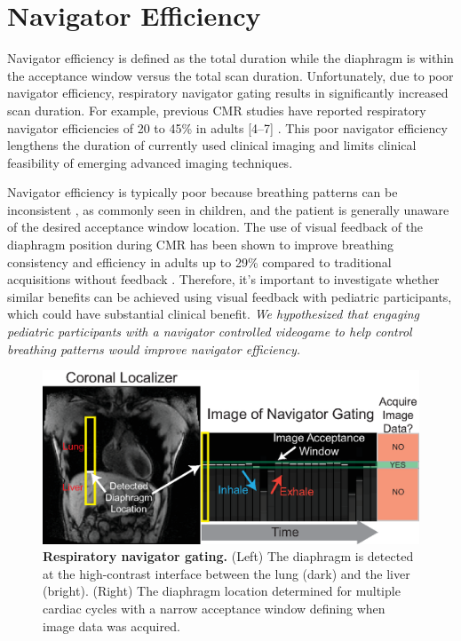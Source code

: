 \section{Navigator Efficiency}
	Navigator efficiency is defined as the total duration while the diaphragm is within the acceptance window versus the total scan duration. Unfortunately, due to poor navigator efficiency, respiratory navigator gating results in significantly increased scan duration. For example, previous CMR studies have reported respiratory navigator efficiencies of 20 to 45\% in adults [4–7] \cite{Abd-Elmoniem2011,Feuerlein2009,Jhooti2011,Wang1996}. This poor navigator efficiency lengthens the duration of currently used clinical imaging and limits clinical feasibility of emerging advanced imaging techniques.
	
	Navigator efficiency is typically poor because breathing patterns can be inconsistent \cite{Liu1993,Wang1995a,Taylor1997a}, as commonly seen in children, and the patient is generally unaware of the desired acceptance window location. The use of visual feedback of the diaphragm position during CMR has been shown to improve breathing consistency and efficiency in adults up to 29\% compared to traditional acquisitions without feedback \cite{Feuerlein2009,Jhooti2011}. Therefore, it's important to investigate whether similar benefits can be achieved using visual feedback with pediatric participants, which could have substantial clinical benefit. \textit{We hypothesized that engaging pediatric participants with a navigator controlled videogame to help control breathing patterns would improve navigator efficiency.}
	
	\begin{figure}
		\centering
		\includegraphics{figures/intro/navigator_gating_explanation}
		\caption[Respiratory navigator gating]{\textbf{Respiratory navigator gating.} (Left) The diaphragm is detected at the high-contrast interface between the lung (dark) and the liver (bright). (Right) The diaphragm location determined for multiple cardiac cycles with a narrow acceptance window	defining when image data was acquired.}
		\label{fig:navigator_gating_explanation}
	\end{figure}

